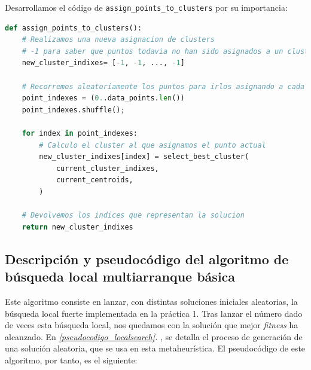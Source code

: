 \documentclass[11pt]{article}
\begin{document}
Desarrollamos el código de \lstinline{assign_points_to_clusters} por su importancia:

\begin{lstlisting}[language=Python, style=Boxed]
def assign_points_to_clusters():
    # Realizamos una nueva asignacion de clusters
    # -1 para saber que puntos todavia no han sido asignados a un cluster
    new_cluster_indixes= [-1, -1, ..., -1]

    # Recorremos aleatoriamente los puntos para irlos asignando a cada cluster
    point_indexes = (0..data_points.len())
    point_indexes.shuffle();

    for index in point_indexes:
        # Calculo el cluster al que asignamos el punto actual
        new_cluster_indixes[index] = select_best_cluster(
            current_cluster_indixes,
            current_centroids,
        )

    # Devolvemos los indices que representan la solucion
    return new_cluster_indixes
\end{lstlisting}

\pagebreak

\subsection{Descripción y pseudocódigo del algoritmo de búsqueda local multiarranque básica}

Este algoritmo consiste en lanzar, con distintas soluciones iniciales aleatorias, la búsqueda local fuerte implementada en la práctica 1. Tras lanzar el número dado de veces esta búsqueda local, nos quedamos con la solución que mejor \emph{fitness} ha alcanzado. En \emph{\ref{pseudocodigo_localsearch}. }, se detalla el proceso de generación de una solución aleatoria, que se usa en esta metaheurística. El pseudocódigo de este algoritmo, por tanto, es el siguiente:
\end{document}
